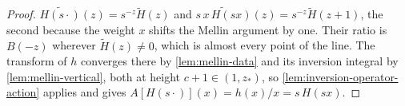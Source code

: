 \begin{proof}
\leanok
{}
$\widetilde{H(s\cdot)}(z) = s^{-z}\tilde H(z)$ and $\widetilde{s\,x\,H(sx)}(z) = s^{-z}\tilde H(z+1)$, the
second because the weight $x$ shifts the Mellin argument by one. Their ratio is $B(-z)$ wherever
$\tilde H(z) \ne 0$, which is almost every point of the line. The transform of $h$ converges there
by \ref{lem:mellin-data} and its inversion integral by \ref{lem:mellin-vertical}, both at height
$c+1 \in (1, z_*)$, so \ref{lem:inversion-operator-action} applies and gives
$A[H(s\cdot)](x) = h(x)/x = s\,H(sx)$.
\end{proof}


